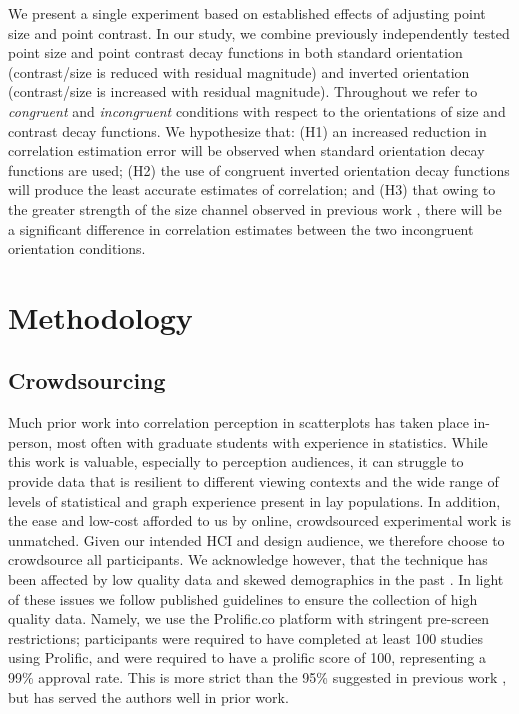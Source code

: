 \documentclass[manuscript, review, anonymous, screen]{acmart}
\begin{document}
We present a single experiment based on established effects of adjusting
point size and point contrast. In our study, we combine previously
independently tested point size and point contrast decay functions in
both standard orientation (contrast/size is reduced with residual
magnitude) and inverted orientation (contrast/size is increased with
residual magnitude). Throughout we refer to \emph{congruent} and
\emph{incongruent} conditions with respect to the orientations of size
and contrast decay functions. We hypothesize that: (H1) an increased
reduction in correlation estimation error will be observed when standard
orientation decay functions are used; (H2) the use of congruent inverted
orientation decay functions will produce the least accurate estimates of
correlation; and (H3) that owing to the greater strength of the size
channel observed in previous work \citep{strain_2023b}, there will be a
significant difference in correlation estimates between the two
incongruent orientation conditions.

\hypertarget{sec-methods}{%
\section{Methodology}\label{sec-methods}}

\hypertarget{sec-crowdsourcing}{%
\subsection{Crowdsourcing}\label{sec-crowdsourcing}}

Much prior work into correlation perception in scatterplots has taken
place in-person, most often with graduate students with experience in
statistics. While this work is valuable, especially to perception
audiences, it can struggle to provide data that is resilient to
different viewing contexts and the wide range of levels of statistical
and graph experience present in lay populations. In addition, the ease
and low-cost afforded to us by online, crowdsourced experimental work is
unmatched. Given our intended HCI and design audience, we therefore
choose to crowdsource all participants. We acknowledge however, that the
technique has been affected by low quality data and skewed demographics
in the past \citep{chmielewski_2020, charalambides_2021, peer_2021}. In
light of these issues we follow published guidelines \citep{peer_2021}
to ensure the collection of high quality data. Namely, we use the
Prolific.co platform \citep{prolific} with stringent pre-screen
restrictions; participants were required to have completed at least 100
studies using Prolific, and were required to have a prolific score of
100, representing a 99\% approval rate. This is more strict than the
95\% suggested in previous work \citep{peer_2021}, but has served the
authors well in prior work.
\end{document}
